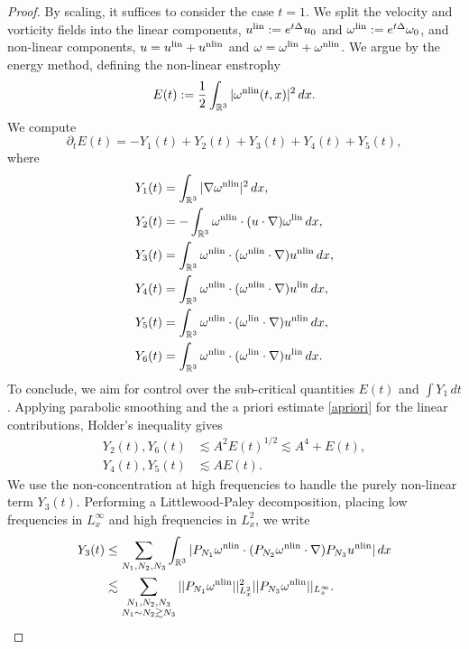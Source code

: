 \begin{proof}
	By scaling, it suffices to consider the case $t = 1$. We split the velocity and vorticity fields into the linear components, $u^{\mathrm{lin}} := e^{t \Delta} u_0$ and $\omega^{\mathrm{lin}} := e^{t \Delta} \omega_0$, and non-linear components, $u = u^{\mathrm{lin}} + u^{\mathrm{nlin}}$ and $\omega = \omega^{\mathrm{lin}} + \omega^{\mathrm{nlin}}$. We argue by the energy method, defining the non-linear enstrophy
		\[
			E(t) := \frac12 \int_{\mathbb R^3} |\omega^{\mathrm{nlin}} (t, x)|^2 \,dx .
		\]
	We compute
		\[
			\partial_t E(t)
				= - Y_1 (t) + Y_2 (t) + Y_3 (t) + Y_4(t) + Y_5 (t),
		\]	
	where
		\begin{align*}
			Y_1 (t)
				&= \int_{\mathbb R^3} |\nabla \omega^{\mathrm{nlin}}|^2 \, dx, \\
			Y_2 (t)
				&=- \int_{\mathbb R^3} \omega^{\mathrm{nlin}} \cdot (u \cdot \nabla) \omega^{\mathrm{lin}} \, dx ,\\
			Y_3 (t)
				&= \int_{\mathbb R^3}\omega^{\mathrm{nlin}} \cdot (\omega^{\mathrm{nlin}} \cdot \nabla) u^{\mathrm{nlin}} \, dx, \\
			Y_4 (t)
				&= \int_{\mathbb R^3} \omega^{\mathrm{nlin}} \cdot (\omega^{\mathrm{nlin}} \cdot \nabla) u^{\mathrm{lin}} \, dx, \\
			Y_5 (t)
				&= \int_{\mathbb R^3} \omega^{\mathrm{nlin}} \cdot (\omega^{\mathrm{lin}} \cdot \nabla) u^{\mathrm{nlin}} \, dx, \\
			Y_6 (t)
				&= \int_{\mathbb R^3}\omega^{\mathrm{nlin}} \cdot (\omega^{\mathrm{lin}} \cdot \nabla) u^{\mathrm{lin}} \, dx.		
		\end{align*}	
	To conclude, we aim for control over the sub-critical quantities $E(t)$ and $\int Y_1 \, dt$. Applying parabolic smoothing and the a priori estimate \eqref{apriori} for the linear contributions, Holder's inequality gives
		\begin{align*}
			Y_2 (t), Y_6 (t)
				&\lesssim A^2 E(t)^{1/2} \lesssim A^4 + E(t), \\
			Y_4 (t), Y_5(t)
				&\lesssim A E(t). 	
		\end{align*}
	We use the non-concentration at high frequencies to handle the purely non-linear term $Y_3 (t)$. Performing a Littlewood-Paley decomposition, placing low frequencies in $L^\infty_x$ and high frequencies in $L^2_x$, we write
		\begin{align*}
			Y_3 (t)
				&\leq \sum_{N_1, N_2, N_3} \int_{\mathbb R^3} |P_{N_1} \omega^{\mathrm{nlin}} \cdot (P_{N_2} \omega^{\mathrm{nlin}} \cdot \nabla) P_{N_3} u^{\mathrm{nlin}}| \, dx \\
				&\lesssim \sum_{\substack{N_1, N_2, N_3 \\ N_1 \sim N_2 \gtrsim N_3} } ||P_{N_1} \omega^{\mathrm{nlin}} ||_{L^2_x}^2 ||P_{N_3} \omega^{\mathrm{nlin}}||_{L^\infty_x}.
		\end{align*}	

\end{proof}
